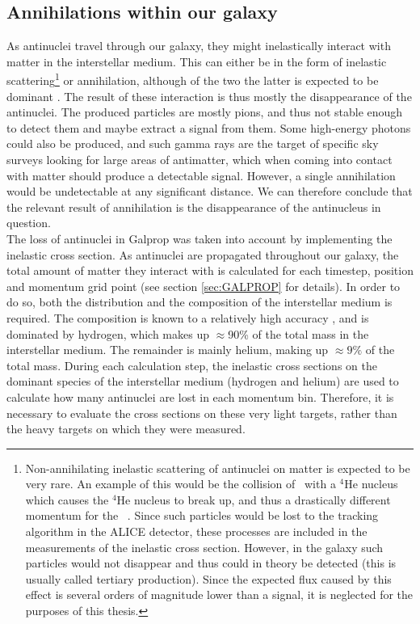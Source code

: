 \subsection{Annihilations within our galaxy}\label{sec:ResAnnInOurGalaxy}
As antinuclei travel through our galaxy, they might inelastically interact with matter in the interstellar medium. This can either be in the form of inelastic scattering\footnote{Non-annihilating inelastic scattering of antinuclei on matter is expected to be very rare. An example of this would be the collision of \ahe\ with a $^4\mathrm{He}$ nucleus which causes the $^4\mathrm{He}$ nucleus to break up, and thus a drastically different momentum for the \ahe\ . Since such particles would be lost to the tracking algorithm in the ALICE detector, these processes are included in the measurements of the inelastic cross section. However, in the galaxy such particles would not disappear and thus could in theory be detected (this is usually called tertiary production). Since the expected flux caused by this effect is several orders of magnitude lower than a signal, it is neglected for the purposes of this thesis.} or annihilation, although of the two the latter is expected to be dominant \cite{}. The result of these interaction is thus mostly the disappearance of the antinuclei. The produced particles are mostly pions, and thus not stable enough to detect them and maybe extract a signal from them. Some high-energy photons could also be produced, and such gamma rays are the target of specific sky surveys looking for large areas of antimatter, which when coming into contact with matter should produce a detectable signal. However, a single annihilation would be undetectable at any significant distance. We can therefore conclude that the relevant result of annihilation is the disappearance of the antinucleus in question. \\

The loss of antinuclei in Galprop was taken into account by implementing the inelastic cross section. As antinuclei are propagated throughout our galaxy, the total amount of matter they interact with is calculated for each timestep, position and momentum grid point (see section \ref{sec:GALPROP} for details). In order to do so, both the distribution and the composition of the interstellar medium is required. The composition is known to a relatively high accuracy \cite{}, and is dominated by hydrogen, which makes up $\approx$90\% of the total mass in the interstellar medium. The remainder is mainly helium, making up $\approx 9\%$ of the total mass. During each calculation step, the inelastic cross sections on the dominant species of the interstellar medium (hydrogen and helium) are used to calculate how many antinuclei are lost in each momentum bin. Therefore, it is necessary to evaluate the cross sections on these very light targets, rather than the heavy targets on which they were measured.\\

